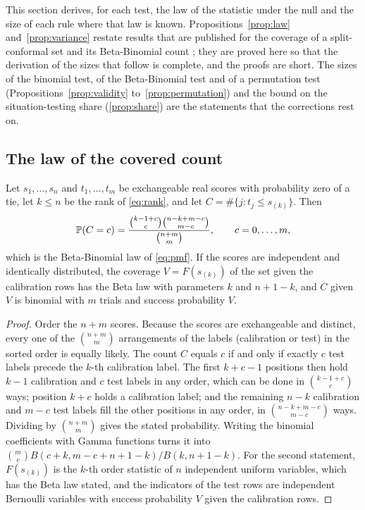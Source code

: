 This section derives, for each test, the law of the statistic under the null and the size of each rule where that law is known. Propositions~\ref{prop:law} and~\ref{prop:variance} restate results that are published for the coverage of a split-conformal set and its Beta-Binomial count \citep{vovk2012,angelopoulos2021}; they are proved here so that the derivation of the sizes that follow is complete, and the proofs are short. The sizes of the binomial test, of the Beta-Binomial test and of a permutation test (Propositions~\ref{prop:validity} to~\ref{prop:permutation}) and the bound on the situation-testing share (\cref{prop:share}) are the statements that the corrections rest on.

\subsection{The law of the covered count}

\begin{proposition}
\label{prop:law}
Let $s_1,\dots,s_n$ and $t_1,\dots,t_m$ be exchangeable real scores with probability zero of a tie, let $k\le n$ be the rank of \cref{eq:rank}, and let $C=\#\{j:t_j\le s_{(k)}\}$. Then
\[
\mathbb{P}(C=c)=\frac{\binom{k-1+c}{c}\binom{n-k+m-c}{m-c}}{\binom{n+m}{m}},\qquad c=0,\dots,m,
\]
which is the Beta-Binomial law of \cref{eq:pmf}. If the scores are independent and identically distributed, the coverage $V=F(s_{(k)})$ of the set given the calibration rows has the Beta law with parameters $k$ and $n+1-k$, and $C$ given $V$ is binomial with $m$ trials and success probability $V$.
\end{proposition}
\begin{proof}
Order the $n+m$ scores. Because the scores are exchangeable and distinct, every one of the $\binom{n+m}{m}$ arrangements of the labels (calibration or test) in the sorted order is equally likely. The count $C$ equals $c$ if and only if exactly $c$ test labels precede the $k$-th calibration label. The first $k+c-1$ positions then hold $k-1$ calibration and $c$ test labels in any order, which can be done in $\binom{k-1+c}{c}$ ways; position $k+c$ holds a calibration label; and the remaining $n-k$ calibration and $m-c$ test labels fill the other positions in any order, in $\binom{n-k+m-c}{m-c}$ ways. Dividing by $\binom{n+m}{m}$ gives the stated probability. Writing the binomial coefficients with Gamma functions turns it into $\binom{m}{c}B(c+k,m-c+n+1-k)/B(k,n+1-k)$. For the second statement, $F(s_{(k)})$ is the $k$-th order statistic of $n$ independent uniform variables, which has the Beta law stated, and the indicators of the test rows are independent Bernoulli variables with success probability $V$ given the calibration rows.
\end{proof}

